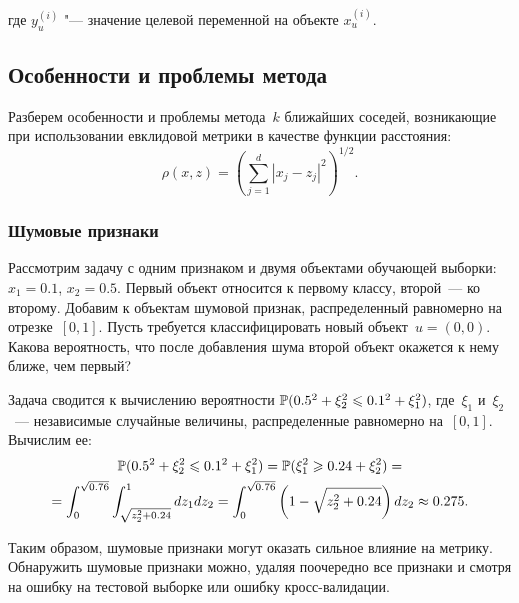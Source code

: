 \documentclass[12pt,fleqn]{article}
\begin{document}
	где $y_u^{(i)}$ "--- значение целевой переменной на объекте $x_u^{(i)}.$
    \subsection{Особенности и проблемы метода}
        Разберем особенности и проблемы метода~$k$ ближайших соседей,
        возникающие при использовании евклидовой метрики в качестве функции расстояния:
        \[
            \rho(x, z) = \left(
                \sum_{j = 1}^{d} |x_j - z_j|^2
            \right)^{1/2}.
        \]
        \subsubsection{Шумовые признаки}
        \begin{vkProblem}
            Рассмотрим задачу с одним признаком и двумя объектами обучающей выборки:
            $x_1 = 0.1$, $x_2 = 0.5$.
            Первый объект относится к первому классу, второй~--- ко второму.
            Добавим к объектам шумовой признак, распределенный равномерно на отрезке~$[0, 1]$.
            Пусть требуется классифицировать новый объект~$u = (0, 0)$.
            Какова вероятность, что после добавления шума второй объект окажется к нему ближе, чем первый?
        \end{vkProblem}

        \begin{esSolution}
            Задача сводится к вычислению вероятности $\mathbb{P} (0.5^2 + \xi_2^2 \leqslant 0.1^2 + \xi_1^2)$,
            где~$\xi_1$ и~$\xi_2$~--- независимые случайные величины, распределенные равномерно на~$[0, 1]$.
            Вычислим ее:
            \begin{multline*}
                \mathbb{P} (0.5^2 + \xi_2^2 \leqslant 0.1^2 + \xi_1^2)
                =
                \mathbb{P} (\xi_1^2 \geqslant 0.24 + \xi_2^2)
                = \\
                =
                \int_{0}^{\sqrt{0.76}} \int_{\sqrt{z_2^2 + 0.24}}^{1} dz_1 dz_2
                =
                \int_{0}^{\sqrt{0.76}} \left(1 - \sqrt{z_2^2 + 0.24}\right) dz_2
                \approx
                0.275.
            \end{multline*}
        \end{esSolution}

        Таким образом, шумовые признаки могут оказать сильное влияние на метрику.
        Обнаружить шумовые признаки можно, удаляя поочередно все признаки и смотря на
        ошибку на тестовой выборке или ошибку кросс-валидации.
        
\end{document}
